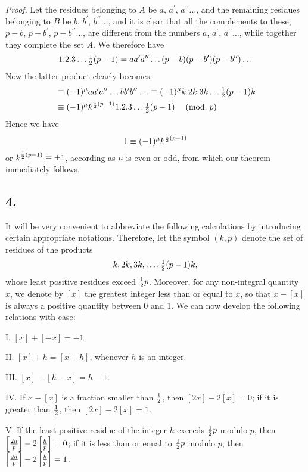 \documentclass[twoside,12pt, showframe]{memoir}
\renewcommand{\pmod}[1]{\;(\textrm{mod.}\;#1)}
\let\oldfrac\frac
\def\frac#1#2{\mathchoice{\tfrac{#1}{#2}}{\oldfrac{#1}{#2}}{\genfrac{}{}{}{2}{#1}{#2\mathstrut}}{\genfrac{}{}{}{3}{#1}{#2\mathstrut}}}
\begin{document}
\textit{Proof.} Let the residues belonging to \(A\) be \(a\), \(a^{\prime}\), \(a^{\prime \prime} \ldots\), and the remaining residues belonging to \(B\) be \(b\), \(b^{\prime}\), \(b^{\prime \prime} \ldots\), and it is clear that all the complements to these, \(p-b\), \(p-b^{\prime}\), \(p-b^{\prime \prime} \ldots\), are different from the numbers \(a\), \(a^{\prime}\), \(a^{\prime \prime} \ldots\), while together they complete the set \(A\). We therefore have
\[1 . 2 . 3 \ldots \frac{1}{2}(p-1)=a a^{\prime} a^{\prime \prime} \ldots(p-b)(p-b^{\prime})(p-b^{\prime \prime}) \ldots\]
Now the latter product clearly becomes
\[\begin{aligned}
& \equiv(-1)^{\mu} a a^{\prime} a^{\prime \prime} \ldots b b^{\prime} b^{\prime \prime} \ldots \equiv(-1)^{\mu} k . 2 k .3 k \ldots \frac{1}{2}(p-1) k \\
& \equiv(-1)^{\mu} k^{\frac{1}{2}(p-1)} 1.2 .3 \ldots \frac{1}{2}(p-1) \quad\pmod{p}
\end{aligned}\]
Hence we have
\[1 \equiv(-1)^{\mu} k^{\frac{1}{2}(p-1)}\]
or \(k^{\frac{1}{2}(p-1)} \equiv \pm 1\), according as \(\mu\) is even or odd, from which our theorem immediately follows.
%

\subsection*{4.}

It will be very convenient to abbreviate the following calculations by introducing certain appropriate notations. Therefore, let the symbol \((k, p)\) denote the set of residues of the products
\[k, 2k, 3k, \ldots, \frac{1}{2}(p-1)k,\]
whose least positive residues exceed \(\frac{1}{2}p\). Moreover, for any non-integral quantity \(x\), we denote by \([x]\) the greatest integer less than or equal to \(x\), so that \(x-[x]\) is always a positive quantity between 0 and 1. We can now develop the following relations with ease:

I. \([x]+[-x]=-1\).

II. \([x]+h=[x+h]\), whenever \(h\) is an integer.

III. \([x]+[h-x]=h-1\).

IV. If \(x-[x]\) is a fraction smaller than \(\frac{1}{2}\), then \([2x]-2[x]=0\); if it is greater than \(\frac{1}{2}\), then \([2x]-2[x]=1\).

V. If the least positive residue of the integer \(h\) exceeds \(\frac{1}{2}p\) modulo \(p\), then \(\left[\frac{2h}{p}\right]-2\left[\frac{h}{p}\right]=0\); if it is less than or equal to \(\frac{1}{2}p\) modulo \(p\), then \(\left[\frac{2h}{p}\right]-2\left[\frac{h}{p}\right]=1\). 
\end{document}

